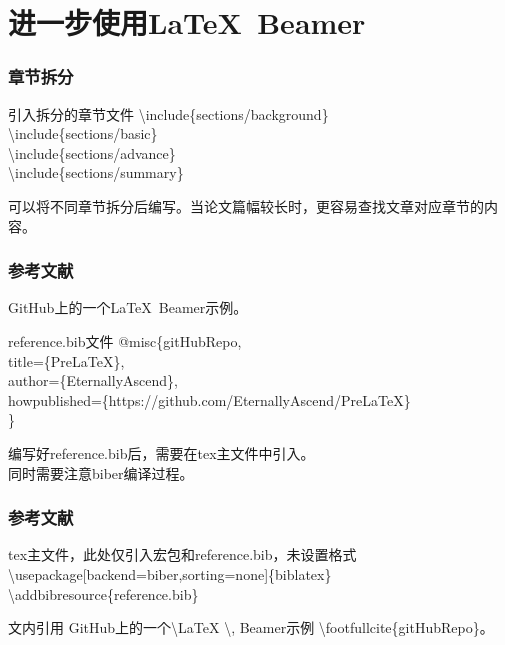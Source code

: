 \section[进一步使用]{进一步使用\LaTeX \, Beamer}

\begin{frame}
    \frametitle{章节拆分}
    \begin{block}{引入拆分的章节文件}
        \textbackslash include\{sections/background\}\\
        \textbackslash include\{sections/basic\}\\
        \textbackslash include\{sections/advance\}\\
        \textbackslash include\{sections/summary\}\\
    \end{block}
    可以将不同章节拆分后编写。当论文篇幅较长时，更容易查找文章对应章节的内容。
\end{frame}

\begin{frame}
    \frametitle{参考文献}
    GitHub上的一个\LaTeX \, Beamer示例。
    \begin{block}{reference.bib文件}
        \small
        @misc\{gitHubRepo,\\
        \quad title=\{PreLaTeX\},\\
        \quad author=\{EternallyAscend\},\\
        \quad howpublished=\{https://github.com/EternallyAscend/PreLaTeX\}\\
        \}
    \end{block}
    编写好reference.bib后，需要在tex主文件中引入。\\
    同时需要注意biber编译过程。
\end{frame}

\begin{frame}
    \frametitle{参考文献}
    \begin{block}{tex主文件，此处仅引入宏包和reference.bib，未设置格式}
        \small
        \textbackslash usepackage[backend=biber,sorting=none]\{biblatex\}\\
        \textbackslash addbibresource\{reference.bib\}
    \end{block}
    \begin{block}{文内引用}
        \small
        GitHub上的一个\textbackslash LaTeX \textbackslash , Beamer示例 \textbackslash footfullcite\{gitHubRepo\}。
    \end{block}
\end{frame}

